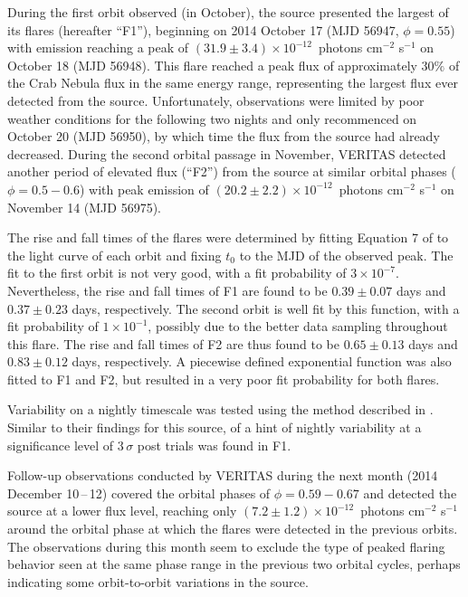 \documentclass[preprint2]{aastex}
\newcommand{\tapp}{\raisebox{0.5ex}{\texttildelow}}
\newcommand{\pflux}{~photons cm$^{-2}$ s$^{-1}$}
\begin{document}
During the first orbit observed (in October), the source presented the largest of its flares (hereafter ``F1''), beginning on 2014 October 17 (MJD 56947, $\phi = 0.55$) with emission reaching a peak of $(31.9 \pm 3.4) \times10^{-12}$\pflux{} on October 18 (MJD 56948). This flare reached a peak flux of approximately $30\%$ of the Crab Nebula flux in the same energy range, representing the largest flux ever detected from the source. Unfortunately, observations were limited by poor weather conditions for the following two nights and only recommenced on October 20 (MJD 56950), by which time the flux from the source had already decreased. During the second orbital passage in November, VERITAS detected another period of elevated flux (``F2'') from the source at similar orbital phases ($\phi = 0.5-0.6$) with peak emission of $(20.2 \pm 2.2) \times10^{-12}$\pflux{} on November 14 (MJD 56975).

The rise and fall times of the flares were determined by fitting Equation 7 of \citet{2010ApJ...722..520A} to the light curve of each orbit and fixing $t_0$ to the MJD of the observed peak. The fit to the first orbit is not very good, with a fit probability of $3 \times 10^{-7}$. Nevertheless, the rise and fall times of F1 are found to be $0.39 \pm 0.07$ days and $0.37 \pm 0.23$ days, respectively. The second orbit is well fit by this function, with a fit probability of $1 \times 10^{-1}$, possibly due to the better data sampling throughout this flare. The rise and fall times of F2 are thus found to be $0.65 \pm 0.13$ days and $0.83 \pm 0.12$ days, respectively. A piecewise defined exponential function was also fitted to F1 and F2, but resulted in a very poor fit probability for both flares. %

Variability on a nightly timescale was tested using the method described in \citet{2013ApJ...779...88A}. Similar to their findings for this source, of a hint of nightly variability at a significance level of \tapp{}$3\,\sigma$ post trials was found in F1.

Follow-up observations conducted by VERITAS during the next month (2014 December 10\,--\,12) covered the orbital phases of $\phi=0.59-0.67$ and detected the source at a lower flux level, reaching only $(7.2 \pm 1.2) \times10^{-12}$\pflux{} around the orbital phase at which the flares were detected in the previous orbits. The observations during this month seem to exclude the type of peaked flaring behavior seen at the same phase range in the previous two orbital cycles, perhaps indicating some orbit-to-orbit variations in the source.
\end{document}
